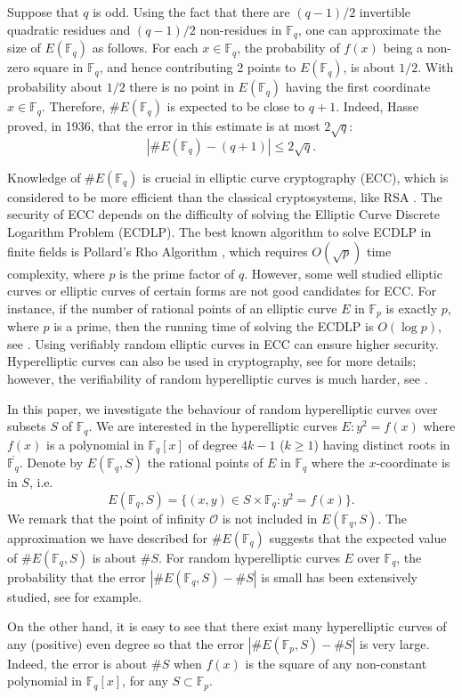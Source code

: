 \documentclass{amsart}
\theoremstyle{plain}
\theoremstyle{definition}
\newcommand{\Fp}{\mathbb{F}_p}
\newcommand{\Fq}{\mathbb{F}_q}
\begin{document}
Suppose that $q$ is odd. Using the fact that there are $(q-1)/2$ invertible quadratic residues and $(q-1)/2$ non-residues in $\Fq$, one can approximate the size of $E(\Fq)$ as follows. For each $x\in\Fq$, the probability of $f(x)$ being a non-zero square in $\Fq$, and hence contributing 2 points to $E(\Fq)$, is about $1/2$. With probability about $1/2$ there is no point in $E(\Fq)$ having the first coordinate $x\in\Fq$. Therefore, $\#E(\Fq)$ is expected to be close to $q+1$. Indeed, Hasse \cite{Has36} proved, in 1936, that the error in this estimate is at most $2\sqrt{q}$:
\[
|\#E(\Fq)-(q+1)|\leq2\sqrt{q}.
\]

Knowledge of $\#E(\Fq)$ is crucial in elliptic curve cryptography (ECC), which is considered to be more efficient than the classical cryptosystems, like RSA \cite{RSA78}. The security of ECC depends on the difficulty of solving the Elliptic Curve Discrete Logarithm Problem (ECDLP). The best known algorithm to solve ECDLP in finite fields is Pollard's Rho Algorithm \cite{Pol75}, which requires $O(\sqrt{p})$ time complexity, where $p$ is the prime factor of $q$. However, some well studied elliptic curves or elliptic curves of certain forms are not good candidates for ECC. For instance, if the number of rational points of an elliptic curve $E$ in $\Fp$ is exactly $p$, where $p$ is a prime, then the running time of solving the ECDLP is $O(\log{p})$, see \cite{Sem98}. Using verifiably random elliptic curves in ECC can ensure higher security. Hyperelliptic curves can also be used in cryptography, see \cite{handbook06} for more details; however, the verifiability of random hyperelliptic curves is much harder, see \cite{HSS01,Sat09}.

In this paper, we investigate the behaviour of random hyperelliptic curves over subsets $S$ of $\Fq$. We are interested in the hyperelliptic curves $E:y^2=f(x)$ where $f(x)$ is a polynomial in $\Fq[x]$ of degree $4k-1$ ($k\geq1$) having distinct roots in $\overline{\Fq}$. Denote by $E(\Fq,S)$ the rational points of $E$ in $\Fq$ where the $x$-coordinate is in $S$, i.e.
\[
E(\Fq,S)=\{(x,y)\in{S}\times\Fq:y^2=f(x)\}.
\]
We remark that the point of infinity $\mathcal{O}$ is not included in $E(\Fq,S)$. The approximation we have described for $\#E(\Fq)$ suggests that the expected value of $\#E(\Fq,S)$ is about $\#S$. For random hyperelliptic curves $E$ over $\Fq$, the probability that the error $|\#E(\Fq,S)-\#S|$ is small has been extensively studied, see \cite{PelRam17,SSS95} for example. 

On the other hand, it is easy to see that there exist many hyperelliptic curves of any (positive) even degree so that the error $|\#E(\Fp,S)-\#S|$ is very large. Indeed, the error is about $\#S$ when $f(x)$ is the square of any non-constant polynomial in $\Fq[x]$, for any $S\subset{\Fp}$.
\end{document}
